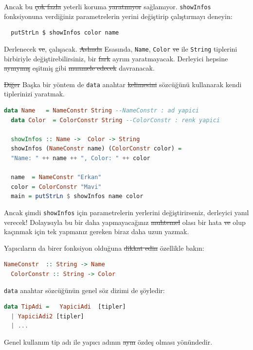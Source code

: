 \documentclass[a4paper,14pt,openany]{extbook} %
\begin{document}
Ancak bu \st{çok fazla} yeterli koruma \st{yaratmıyor} sağlamıyor. \lstinline!showInfos! fonksiyonuna verdiğiniz parametrelerin yerini değiştirip çalıştırmayı deneyin:

\begin{lstlisting}
  putStrLn $ showInfos color name
\end{lstlisting}

Derlenecek \st{ve}, çalışacak. \st{Aslında} Esasında, \lstinline!Name!, \lstinline!Color! \st{ve} ile
\lstinline!String! tiplerini birbiriyle değiştirebilirsiniz, bir \st{fark} ayrım
yaratmayacak. Derleyici hepsine \st{aynıymış} eşitmiş gibi \st{muamele edecek} davranacak.

\st{Diğer} Başka bir yöntem de \lstinline!data! anahtar \st{kelimesini} sözcüğünü kullanarak kendi tiplerinizi yaratmak.

\begin{lstlisting}[language=Haskell]
  data Name   = NameConstr String --NameConstr : ad yapici
  data Color  = ColorConstr String --ColorConstr : renk yapici

  showInfos :: Name ->  Color -> String
  showInfos (NameConstr name) (ColorConstr color) =
  "Name: " ++ name ++ ", Color: " ++ color

  name  = NameConstr "Erkan"
  color = ColorConstr "Mavi"
  main = putStrLn $ showInfos name color
\end{lstlisting}

Ancak şimdi \lstinline!showInfos! için parametrelerin yerlerini
değiştirirseniz, derleyici yanıl verecek! Dolayısıyla bu bir daha yapmayacağınız
\st{muhtemel} olası bir hata \st{ve} olup kaçınmak için tek yapmanız gereken biraz daha uzun yazmak.

Yapıcıların da birer fonksiyon olduğuna \st{dikkat edin} özellikle bakın:

\begin{lstlisting}[language=Haskell]
  NameConstr  :: String -> Name
  ColorConstr :: String -> Color
\end{lstlisting}

\lstinline!data! anahtar sözcüğünün genel söz dizimi de şöyledir:

\begin{lstlisting}[language=Haskell]
  data TipAdi =   YapiciAdi  [tipler]
  | YapiciAdi2 [tipler]
  | ...
\end{lstlisting}

Genel kullanım tip adı ile yapıcı adının \st{aynı} özdeş olması yönündedir.
\end{document}
